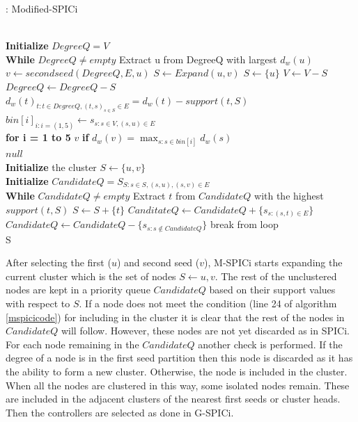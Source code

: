 \documentclass[times]{dacauth}
\begin{document}
\begin{algorithm}
	\caption{: Modified-SPICi}\label{mspicicode}
	\begin{algorithmic}[1]
		 \\
		\textbf{Initialize} $DegreeQ = V$ \\
		\textbf{While} $DegreeQ \neq empty$
		\State Extract u from DegreeQ with largest $d_w(u)$
		\State $v \gets secondseed(DegreeQ,E,u)$
		 $S \gets Expand(u,v)$
		\EndIf
		\Else 
		\State $S \gets \{u\}$
		\EndIf
		\State $V \gets V - S $
		\State $Degree Q \gets Degree Q - S$
		\State $d_w(t)_{t:t\in DegreeQ,(t,s)_{s\in S}\in E} = d_w(t) - support(t,S)$
		\EndProcedure
		 \\
		$bin[i]_{i:i=(1,5)} \gets s_{s:s\in V,(s,u)\in E}$ \\
		\textbf{for i = 1 to 5}
		\State \Return $v$ \textbf{if} $d_w(v)=\max_{s:s\in bin[i]}{d_w(s)}$
		\EndIf\\
		\Return $null$
		\EndProcedure
		\\
		\textbf{Initialize} the cluster $S \gets \{u,v\}$ \\
		\textbf{Initialize} $CandidateQ = S_{S:s\in S,(s,u),(s,v)\in E}$\\
		\textbf{While} $CandidateQ \neq empty$
		\State Extract $t$ from $CandidateQ$ with the highest $support(t,S)$
		\State $S\gets S+\{t\}$
		\State $CanditateQ \gets CandidateQ + \{s_{s:(s,t)\in E}\}$
		\State $CandidateQ \gets CandidateQ - \{s_{s:s\not\in CandidateQ}\}$
		\Else
		\State break from loop
		\EndIf \\
		\Return S
		\EndProcedure
	\end{algorithmic}
\end{algorithm}
After selecting the first ($u$) and second seed ($v$), M-SPICi starts expanding the current cluster which is the set of nodes $S\gets{u,v}$. The rest of the unclustered nodes are kept in a priority queue $CandidateQ$ based on their support values with respect to $S$. If a node does not meet the condition (line 24 of algorithm \ref{mspicicode}) for including in the cluster it is clear that the rest of the nodes in $CandidateQ$ will follow. However, these nodes are not yet discarded as in SPICi. For each node remaining in the $CandidateQ$ another check is performed. If the degree of a node is in the first seed partition then this node is discarded as it has the ability to form a new cluster. Otherwise, the node is included in the cluster.
When all the nodes are clustered in this way, some isolated nodes remain. These are included in the adjacent clusters of the nearest first seeds or cluster heads. Then the controllers are selected as done in G-SPICi.
\end{document}
